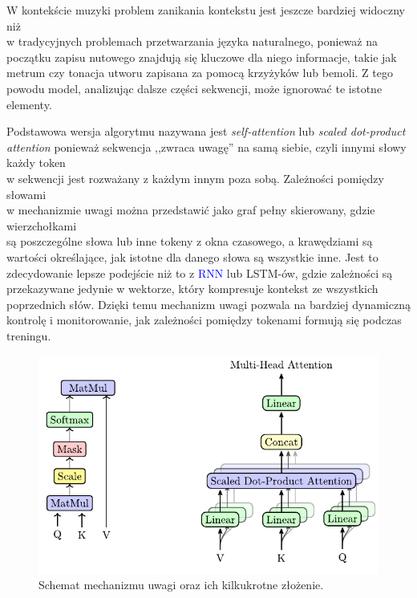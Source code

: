 \documentclass[data-science]{agh-wi} %
\begin{document}
W kontekście muzyki problem zanikania kontekstu jest jeszcze bardziej widoczny niż \\ w tradycyjnych problemach przetwarzania języka naturalnego, ponieważ na początku zapisu nutowego znajdują się kluczowe dla niego informacje, takie jak metrum czy tonacja utworu zapisana za pomocą krzyżyków lub bemoli. Z tego powodu model, analizując dalsze części sekwencji, może ignorować te istotne elementy.

Podstawowa wersja algorytmu nazywana jest \textit{self-attention} lub \textit{scaled dot-product attention} ponieważ sekwencja ,,zwraca uwagę'' na samą siebie, czyli innymi słowy każdy token\\  w sekwencji jest rozważany z każdym innym poza sobą. Zależności pomiędzy słowami\\ w mechanizmie uwagi można przedstawić jako graf pełny skierowany, gdzie wierzchołkami\\ są poszczególne słowa lub inne tokeny z okna czasowego, a krawędziami są wartości określające, jak istotne dla danego słowa są wszystkie inne. Jest to zdecydowanie lepsze podejście niż to z \textcolor{blue}{RNN} lub LSTM-ów, gdzie zależności są przekazywane jedynie w wektorze, który kompresuje kontekst ze wszystkich poprzednich słów. Dzięki temu mechanizm uwagi pozwala na bardziej dynamiczną kontrolę i monitorowanie, jak zależności pomiędzy tokenami formują się podczas treningu.


\begin{figure}[ht!]
    \centering
    \includegraphics[width=0.7\linewidth]{./img/attention_heads.pdf}
    \caption{Schemat mechanizmu uwagi oraz ich kilkukrotne złożenie.}\label{fig:attention_heads}
\end{figure}
\end{document}
